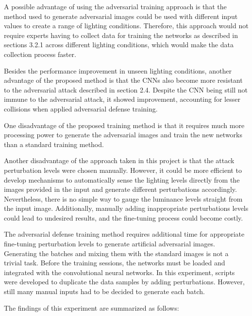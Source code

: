 \documentclass[12pt]{article}
\begin{document}
A possible advantage of using the adversarial training approach is that the method used to generate adversarial images could be used with different input values to create a range of lighting conditions. Therefore, this approach would not require experts having to collect data for training the networks as described in sections 3.2.1 across different lighting conditions, which would make the data collection process faster. 

Besides the performance improvement in unseen lighting conditions, another advantage of the proposed method is that the CNNs also become more resistant to the adversarial attack described in section 2.4. Despite the CNN being still not immune to the adversarial attack, it showed improvement, accounting for lesser collisions when applied adversarial defense training. 

One disadvantage of the proposed training method is that it requires much more processing power to generate the adversarial images and train the new networks than a standard training method. 

Another disadvantage of the approach taken in this project is that the attack perturbation levels were chosen manually. However, it could be more efficient to develop mechanisms to automatically sense the lighting levels directly from the images provided in the input and generate different perturbations accordingly. Nevertheless, there is no simple way to gauge the luminance levels straight from the input image. Additionally, manually adding inappropriate perturbations levels could lead to undesired results, and the fine-tuning process could become costly.

The adversarial defense training method requires additional time for appropriate fine-tuning perturbation levels to generate artificial adversarial images. Generating the batches and mixing them with the standard images is not a trivial task. Before the training sessions, the networks must be loaded and integrated with the convolutional neural networks. In this experiment, scripts were developed to duplicate the data samples by adding perturbations. However, still many manual inputs had to be decided to generate each batch.

The findings of this experiment are summarized as follows:
\end{document}
